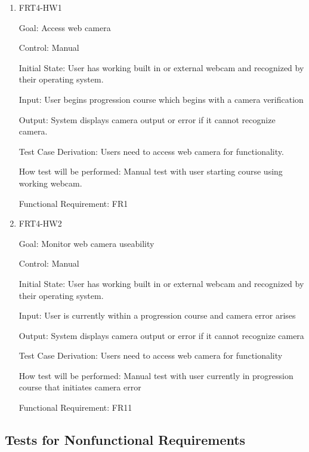 \documentclass[12pt, titlepage]{article}
\begin{document}
\begin{enumerate}

\item{FRT4-HW1}

Goal: Access web camera

Control: Manual
					
Initial State: User has working built in or external webcam and recognized by their operating system.
					
Input: User begins progression course which begins with a camera verification
					
Output: System displays camera output or error if it cannot recognize camera.

Test Case Derivation: Users need to access web camera for functionality.
					
How test will be performed: Manual test with user starting course using working webcam.

Functional Requirement: FR1

\item{FRT4-HW2}

Goal: Monitor web camera useability

Control: Manual
					
Initial State: User has working built in or external webcam and recognized by their operating system.
					
Input: User is currently within a progression course and camera error arises
					
Output: System displays camera output or error if it cannot recognize camera

Test Case Derivation: Users need to access web camera for functionality
					
How test will be performed: Manual test with user currently in progression course that initiates camera error

Functional Requirement: FR11

\end{enumerate}

\subsection{Tests for Nonfunctional Requirements}

\end{document}
